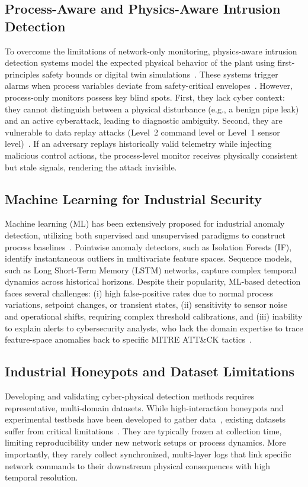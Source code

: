 \documentclass[journal,twoside,web]{ieeecolor}
\begin{document}
\subsection{Process-Aware and Physics-Aware Intrusion Detection}
To overcome the limitations of network-only monitoring, physics-aware intrusion detection systems model the expected physical behavior of the plant using first-principles safety bounds or digital twin simulations~\cite{yigit2023twinpot, lucchese2023honeyics}. These systems trigger alarms when process variables deviate from safety-critical envelopes~\cite{recordercharts_pipeline}. However, process-only monitors possess key blind spots. First, they lack cyber context: they cannot distinguish between a physical disturbance (e.g., a benign pipe leak) and an active cyberattack, leading to diagnostic ambiguity. Second, they are vulnerable to data replay attacks (Level~2 command level or Level~1 sensor level)~\cite{sans2016analysis}. If an adversary replays historically valid telemetry while injecting malicious control actions, the process-level monitor receives physically consistent but stale signals, rendering the attack invisible.

\subsection{Machine Learning for Industrial Security}
Machine learning (ML) has been extensively proposed for industrial anomaly detection, utilizing both supervised and unsupervised paradigms to construct process baselines~\cite{umer2022machine}. Pointwise anomaly detectors, such as Isolation Forests (IF), identify instantaneous outliers in multivariate feature spaces. Sequence models, such as Long Short-Term Memory (LSTM) networks, capture complex temporal dynamics across historical horizons. Despite their popularity, ML-based detection faces several challenges: (i) high false-positive rates due to normal process variations, setpoint changes, or transient states, (ii) sensitivity to sensor noise and operational shifts, requiring complex threshold calibrations, and (iii) inability to explain alerts to cybersecurity analysts, who lack the domain expertise to trace feature-space anomalies back to specific MITRE ATT\&CK tactics~\cite{mitre2021attack}.

\subsection{Industrial Honeypots and Dataset Limitations}
Developing and validating cyber-physical detection methods requires representative, multi-domain datasets. While high-interaction honeypots and experimental testbeds have been developed to gather data~\cite{franco2021survey, pironti2025icslure, pozzo2025honeynetics}, existing datasets suffer from critical limitations~\cite{conti2021survey}. They are typically frozen at collection time, limiting reproducibility under new network setups or process dynamics. More importantly, they rarely collect synchronized, multi-layer logs that link specific network commands to their downstream physical consequences with high temporal resolution.
\end{document}
